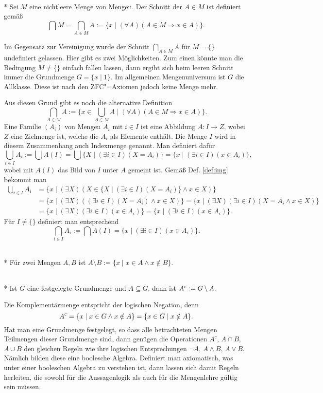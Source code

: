 \begin{Definition}\mbox{}\\*
Sei $M$ eine nichtleere Menge von Mengen. Der Schnitt der $A\in M$
ist definiert gemäß
\[\bigcap M = \bigcap_{A\in M} A := \{x\mid(\forall A)(A\in M\Rightarrow x\in A)\}.\]
\end{Definition}
Im Gegensatz zur Vereinigung wurde der Schnitt $\bigcap_{A\in M} A$ 
für $M=\{\}$ undefiniert gelassen. Hier gibt es zwei Möglichkeiten.
Zum einen könnte man die Bedingung $M\ne\{\}$ einfach fallen
lassen, dann ergibt sich beim leeren Schnitt immer die Grundmenge
$G=\{x\mid 1\}$. Im allgemeinen Mengenuniversum ist $G$ die
Allklasse. Diese ist nach den ZFC"=Axiomen jedoch keine Menge mehr.

Aus diesen Grund gibt es noch die alternative Definition
\[\bigcap_{A\in M} A :=
\{x\in\bigcup_{A\in M} A\mid(\forall A)(A\in M\Rightarrow x\in A)\}.\]
Eine Familie $(A_i)$ von Mengen $A_i$ mit $i\in I$ ist eine Abbildung
$A\colon I\to Z$, wobei $Z$ eine Zielmenge ist, welche die
$A_i$ als Elemente enthält. Die Menge $I$ wird in diesem Zusammenhang
auch Indexmenge genannt. Man definiert dafür
\[\bigcup_{i\in I} A_i := \bigcup A(I)
= \bigcup\{X\mid(\exists i\in I)(X=A_i)\} = \{x\mid (\exists i\in I)(x\in A_i)\},\]
wobei mit $A(I)$ das Bild von $I$ unter $A$ gemeint ist. Gemäß Def. \ref{def:img} bekommt man
\begin{align*}
\bigcup_{i\in I} A_i
&= \{x\mid (\exists X)(X\in \{X\mid(\exists i\in I)(X=A_i)\}\land x\in X)\}\\
&= \{x\mid (\exists X)((\exists i\in I)(X=A_i)\land x\in X)\}
= \{x\mid (\exists X)(\exists i\in I)(X=A_i\land x\in X)\}\\
&= \{x\mid (\exists X)(\exists i\in I)(x\in A_i)\}
= \{x\mid (\exists i\in I)(x\in A_i)\}.
\end{align*}
Für $I\ne\{\}$ definiert man entsprechend
\[\bigcap_{i\in I} A_i := \bigcap A(I) = \{x\mid (\exists i\in I)(x\in A_i)\}.\]

\newpage
\begin{Definition}[Differenzmenge]\mbox{}\\*
Für zwei Mengen $A,B$ ist
$A\setminus B := \{x\mid x\in A\land x\notin B\}$.
\end{Definition}
\begin{Definition}[Komplementärmenge]\mbox{}\\*
Ist $G$ eine festgelegte Grundmenge und $A\subseteq G$, dann ist
$A^\mathrm c := G\setminus A$.
\end{Definition}
Die Komplementärmenge entspricht der logischen Negation, denn
\[A^\mathrm c = \{x\mid x\in G\land x\notin A\}
= \{x\in G\mid x\notin A\}.\]
Hat man eine Grundmenge festgelegt, so dass alle betrachteten
Mengen Teilmengen dieser Grundmenge sind, dann genügen die
Operationen $A^{\mathrm c}$, $A\cap B$, $A\cup B$
den gleichen Regeln wie ihre logischen Entsprechungen $\neg A$,
$A\land B$, $A\lor B$. Nämlich bilden diese eine boolesche Algebra.
Definiert man axiomatisch, was unter einer booleschen Algebra
zu verstehen ist, dann lassen sich damit Regeln herleiten, die
sowohl für die Aussagenlogik als auch für die Mengenlehre
gültig sein müssen.

